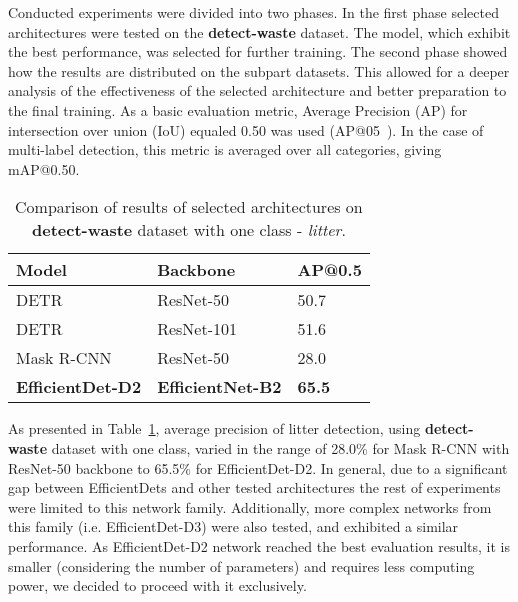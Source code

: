 \documentclass{article}
\begin{document}
Conducted experiments were divided into two phases. In the first phase selected architectures were tested on the \textbf{detect-waste} dataset. The model, which exhibit the best performance, was selected for further training. The second phase showed how the results are distributed on the subpart datasets. This allowed for a deeper analysis of the effectiveness of the selected architecture and better preparation to the final training. As a basic evaluation metric, Average Precision (AP) for intersection over union (IoU) equaled 0.50 was used (AP@05~\cite{pascal}). In the case of multi-label detection, this metric is averaged over all categories, giving mAP@0.50.

{
\begin{table}[!hbt]
\centering
\caption{Comparison of results of selected architectures  on \textbf{detect-waste} dataset with one class - \textit{litter}.}
\label{tab:archcomp}
\begin{tabular}{lll}
\hline
\textbf{Model}           & \textbf{Backbone}        & \textbf{AP@0.5} \\ \hline
DETR            & ResNet-50       & 50.7  \\ 
DETR            & ResNet-101      & 51.6  \\ 
Mask R-CNN      & ResNet-50       & 28.0  \\
\textbf{EfficientDet-D2} & \textbf{EfficientNet-B2} & \textbf{65.5}  \\ 
\hline
\end{tabular}
\end{table}
}

As presented in Table~\ref{tab:archcomp}, average precision of litter detection, using \textbf{detect-waste} dataset with one class, varied in the range of 28.0\% for Mask R-CNN with ResNet-50 backbone to 65.5\% for EfficientDet-D2. In general, due to a significant gap between EfficientDets and other tested architectures the rest of experiments were limited to this network family. Additionally, more complex networks from this family (i.e. EfficientDet-D3) were also tested, and exhibited a similar performance. As EfficientDet-D2 network reached the best evaluation results, it is smaller (considering the number of parameters) and requires less computing power, we decided to proceed with it exclusively.
\end{document}
